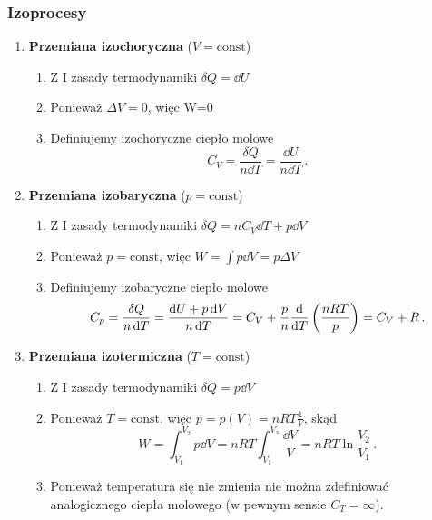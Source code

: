 \documentclass[../main.tex]{subfiles}
\begin{document}
\subsubsection{Izoprocesy}
\begin{enumerate}
    \item \textbf{Przemiana izochoryczna} (\(V=\text{const}\))
    
    \begin{enumerate}
        \item Z I zasady termodynamiki \(\delta Q=\dd{U}\)
        \item Ponieważ \(\Delta V=0\), więc W=0
        \item Definiujemy izochoryczne ciepło molowe 
        \begin{equation*}
            C_V=\frac{\delta Q}{n\dd{T}}=\frac{\dd{U}}{n\dd{T}}\,.
        \end{equation*}
    \end{enumerate}
    
    \item \textbf{Przemiana izobaryczna} (\(p=\text{const}\))
    
    \begin{enumerate}
        \item Z I zasady termodynamiki \(\delta Q=nC_V\dd{T}+p\dd{V}\)
        \item Ponieważ \(p=\text{const}\), więc \( W=\int p\dd{V}=p\Delta V\)
        \item Definiujemy izobaryczne ciepło molowe 
        \begin{equation*}
            C_p=\frac{\delta Q}{n\dd{T}}=\frac{\dd{U}+p\dd{V}}{n\dd{T}}=C_V+\frac{p}{n}\dv{}{T} \left(\frac{nRT}{p}\right)=C_V+R\,.
        \end{equation*}
    \end{enumerate}
    
    \item \textbf{Przemiana izotermiczna} (\(T=\text{const}\))
    
    \begin{enumerate}
        \item Z I zasady termodynamiki \(\delta Q=p\dd{V}\)
        \item Ponieważ \(T=\text{const}\), więc \(p=p(V)=nRT\frac{1}{V}\), skąd
        \begin{equation*}
            W=\int_{V_1}^{V_2}p\dd{V}=nRT\int_{V_1}^{V_2}\frac{\dd{V}}{V}=nRT\ln\frac{V_2}{V_1}\,.
        \end{equation*}
        \item Ponieważ temperatura się nie zmienia nie można zdefiniować analogicznego ciepła
        molowego (w pewnym sensie \(C_T=\infty\)).\\
    \end{enumerate}
    

\end{enumerate}
\end{document}
